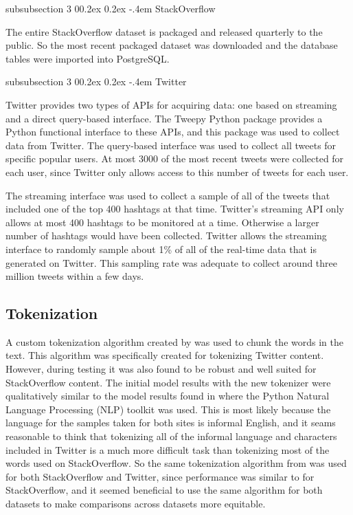 \documentclass[man,floatsintext,donotrepeattitle]{apa6}
\makeatletter
\renewcommand{\subsubsection}{%
  \@startsection
  {subsubsection}%
  {3}%
  {\parindent}%
  {0\baselineskip \@plus 0.2ex \@minus 0.2ex}%
  {-.4em}%
  {\normalfont\normalsize\bfseries\addperi}}
\makeatother
\begin{document}
\subsubsection{StackOverflow}

The entire StackOverflow dataset is packaged and released quarterly to the public.
So the most recent packaged dataset was downloaded and the database tables were imported into PostgreSQL.

\subsubsection{Twitter}

Twitter provides two types of APIs for acquiring data: one based on streaming and a direct query-based interface.
The Tweepy Python package provides a Python functional interface to these APIs, and this package was used to collect data from Twitter.
The query-based interface was used to collect all tweets for specific popular users.
At most \num{3000} of the most recent tweets were collected for each user, since Twitter only allows access to this number of tweets for each user.

The streaming interface was used to collect a sample of all of the tweets that included one of the top 400 hashtags at that time.
Twitter's streaming API only allows at most 400 hashtags to be monitored at a time.
Otherwise a larger number of hashtags would have been collected.
Twitter allows the streaming interface to randomly sample about 1\% of all of the real-time data that is generated on Twitter.
This sampling rate was adequate to collect around three million tweets within a few days.

\subsection{Tokenization}

A custom tokenization algorithm created by \textcite{Owoputi2013} was used to chunk the words in the text.
This algorithm was specifically created for tokenizing Twitter content.
However, during testing it was also found to be robust and well suited for StackOverflow content.
The initial model results with the new tokenizer were qualitatively similar to the model results found in \textcite{Stanley2013} where the Python Natural Language Processing (NLP) toolkit \parencite{Bird2009} was used.
This is most likely because the language for the samples taken for both sites is informal English,
and it seams reasonable to think that tokenizing all of the informal language and characters included in Twitter is a much more difficult task than tokenizing most of the words used on StackOverflow.
So the same tokenization algorithm from \textcite{Owoputi2013} was used for both StackOverflow and Twitter, since performance was similar to \textcite{Stanley2013} for StackOverflow,
and it seemed beneficial to use the same algorithm for both datasets to make comparisons across datasets more equitable.
\end{document}
